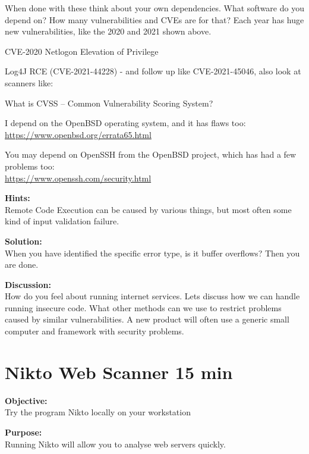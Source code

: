 \documentclass[a4paper,11pt,notitlepage]{report}
\begin{document}
When done with these think about your own dependencies. What software do you depend on? How many vulnerabilities and CVEs are for that? Each year has huge new vulnerabilities, like the 2020 and 2021 shown above.

\begin{list2}
\item CVE-2020 Netlogon Elevation of Privilege \\
\item Log4J RCE (CVE-2021-44228) - and follow up like CVE-2021-45046, also look at scanners like:\\
\end{list2}

What is CVSS -- Common Vulnerability Scoring System?

I depend on the OpenBSD operating system, and it has flaws too:\\
\url{https://www.openbsd.org/errata65.html}

You may depend on OpenSSH from the OpenBSD project, which has had a few problems too:\\
\url{https://www.openssh.com/security.html}

{\bf Hints:}\\
Remote Code Execution can be caused by various things, but most often some kind of input validation failure.

{\bf Solution:}\\
When you have identified the specific error type, is it buffer overflows? Then you are done.

{\bf Discussion:}\\
How do you feel about running internet services. Lets discuss how we can handle running insecure code.
What other methods can we use to restrict problems caused by similar vulnerabilities.
A new product will often use a generic small computer and framework with security problems.




\chapter{Nikto Web Scanner 15 min}
\label{ex:nikto-webscanner}

{\bf Objective:}\\
Try the program Nikto locally on your workstation


{\bf Purpose:}\\
Running Nikto will allow you to analyse web servers quickly.
\end{document}
